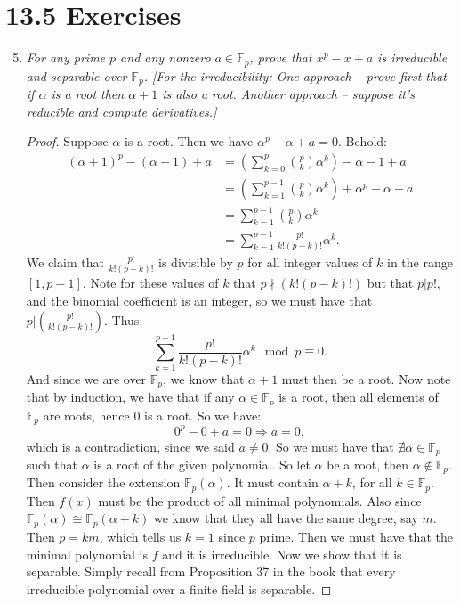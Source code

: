 \documentclass[9pt,reqno,twoside]{amsbook}
\theoremstyle{plain}
\numberwithin{section}{chapter}
\numberwithin{equation}{chapter}
\theoremstyle{definition}
\theoremstyle{remark}
\theoremstyle{plain}
\newcommand{\F}{\mathbb{F}}
\newcommand{\bee}{\begin{equation}\begin{aligned}}
\newcommand{\eee}{\end{aligned}\end{equation}}
\newcommand{\fracc}{\frac}
\newcommand{\lpar}{\left(}
\newcommand{\rpar}{\right)}
\begin{document}
\section{13.5 Exercises}

\begin{enumerate}[label=\arabic*.]
\setcounter{enumi}{4}

\item \textit{For any prime $p$ and any nonzero $a \in \F_p$, prove that $x^p - x + a$ is irreducible and separable over $\F_p$. [For the irreducibility: One approach -- prove first that if $\alpha$ is a root then $\alpha + 1$ is also a root. Another approach -- suppose it's reducible and compute derivatives.]}

\begin{proof}
Suppose $\alpha$ is a root. Then we have $\alpha^p - \alpha + a = 0$. Behold: 
\bee
(\alpha + 1)^p - (\alpha + 1) + a &= \lpar\sum_{k = 0}^p \binom{p}{k}\alpha^k\rpar - \alpha - 1 + a\\
&= \lpar \sum_{k = 1}^{p - 1} \binom{p}{k}\alpha^k \rpar + \alpha^p - \alpha + a\\
&= \sum_{k = 1}^{p - 1} \binom{p}{k}\alpha^k \\
&= \sum_{k = 1}^{p - 1} \fracc{p!}{k!(p - k)!}\alpha^k.
\eee
We claim that $\fracc{p!}{k!(p - k)!}$ is divisible by $p$ for all integer values of $k$ in the range $[1,p - 1]$. Note for these values of $k$ that $p\nmid (k!(p - k)!)$ but that $p|p!$, and the binomial coefficient is an integer, so we must have that $p|\lpar \fracc{p!}{k!(p - k)!} \rpar $. Thus: 
$$
\sum_{k = 1}^{p - 1} \fracc{p!}{k!(p - k)!}\alpha^k \mod p \equiv 0.
$$
And since we are over $\F_p$, we know that $\alpha + 1$ must then be a root. Now note that by induction, we have that if any $\alpha \in \F_p$ is a root, then all elements of $\F_p$ are roots, hence $0$ is a root. So we have:
$$
0^p - 0 + a = 0 \Rightarrow a = 0,
$$
which is a contradiction, since we said $a\neq 0$. So we must have that $\nexists \alpha \in \F_p$ such that $\alpha$ is a root of the given polynomial. So let $\alpha$ be a root, then $\alpha \notin \F_p$. Then consider the extension $\F_p(\alpha)$. It must contain $\alpha + k$, for all $k \in \F_p$. Then $f(x)$ must be the product of all minimal polynomials. Also since $\F_p(\alpha) \cong \F_p(\alpha + k)$ we know that they all have the same degree, say $m$. Then $p = km$, which tells us $k = 1$ since $p$ prime. Then we must have that the minimal polynomial is $f$ and it is irreducible. 
Now we show that it is separable. Simply recall from Proposition 37 in the book that every irreducible polynomial over a finite field is separable. 
\end{proof}



\end{enumerate}
\end{document}

